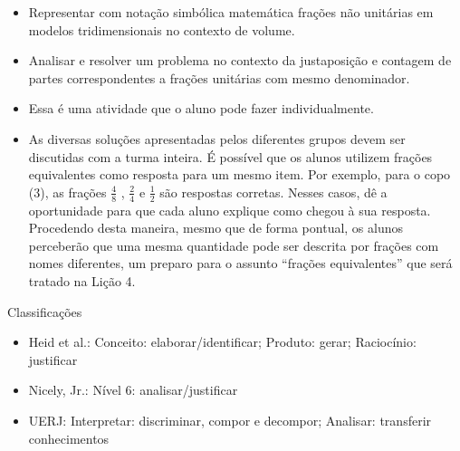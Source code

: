 \documentclass[oneside]{book}
\begin{document}
\begin{multicols}{2}
   \vspace{.1cm}

  \begin{itemize} %
    \item       Representar com notação simbólica matemática frações não unitárias em modelos tridimensionais no contexto de volume.
    \item       Analisar e resolver um problema no contexto da justaposição e contagem de partes correspondentes a frações unitárias com mesmo denominador.
\end{itemize} %


  \vspace{.1cm}
  
    \vspace{.1cm}

    \begin{itemize} %
    \item       Essa é uma atividade que o aluno pode fazer individualmente.
    \item       As diversas soluções apresentadas pelos diferentes grupos devem ser discutidas com a turma inteira. É possível que os alunos utilizem frações equivalentes como resposta para um mesmo item. Por exemplo, para o copo (3), as frações       $\frac{4}{8}$      ,       $\frac{2}{4}$       e       $\frac{1}{2}$       são respostas corretas. Nesses casos, dê a oportunidade para que cada aluno explique como chegou à sua resposta. Procedendo desta maneira, mesmo que de forma pontual, os alunos perceberão que uma mesma quantidade pode ser descrita por frações com nomes diferentes, um preparo para o assunto       ``frações equivalentes''       que será tratado na Lição 4.
\end{itemize} %


  Classificações
\begin{itemize} %
    \item       Heid et al.: Conceito: elaborar/identificar; Produto: gerar; Raciocínio: justificar
    \item       Nicely, Jr.: Nível 6: analisar/justificar
    \item       UERJ: Interpretar: discriminar, compor e decompor; Analisar: transferir conhecimentos
\end{itemize} %



\end{multicols}
\end{document}
